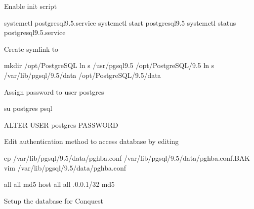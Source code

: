 \documentclass[letterpaper,10pt,english]{sphinxmanual}
\begin{document}
Enable init script

%
\begin{sphinxVerbatim}[commandchars=\\\{\}]
systemctl  postgresql\PYGZhy{}9.5.service
systemctl start postgresql\PYGZhy{}9.5
systemctl status postgresql\PYGZhy{}9.5.service
\end{sphinxVerbatim}

Create symlink to 

%
\begin{sphinxVerbatim}[commandchars=\\\{\}]
mkdir /opt/PostgreSQL
ln \PYGZhy{}s /usr/pgsql\PYGZhy{}9.5 /opt/PostgreSQL/9.5
ln \PYGZhy{}s /var/lib/pgsql/9.5/data /opt/PostgreSQL/9.5/data
\end{sphinxVerbatim}

Assign password to user postgres

%
\begin{sphinxVerbatim}[commandchars=\\\{\}]
su postgres
psql

ALTER USER postgres PASSWORD 

\end{sphinxVerbatim}

Edit authentication method to access database by editing 

%
\begin{sphinxVerbatim}[commandchars=\\\{\}]
cp /var/lib/pgsql/9.5/data/pg\PYGZus{}hba.conf /var/lib/pgsql/9.5/data/pg\PYGZus{}hba.conf.BAK
vim /var/lib/pgsql/9.5/data/pg\PYGZus{}hba.conf
\end{sphinxVerbatim}

%
\begin{sphinxVerbatim}[commandchars=\\\{\}]
   all             all                                     md5
host    all             all             .0.0.1/32            md5
\end{sphinxVerbatim}

Setup the database for Conquest
\end{document}
